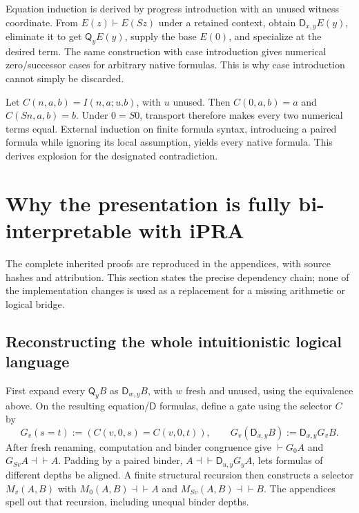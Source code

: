 \documentclass[11pt,letterpaper]{article}
\theoremstyle{definition}\newtheorem{definition}[theorem]{Definition}
\theoremstyle{remark}\newtheorem{remark}[theorem]{Remark}
\newcommand{\D}{\mathsf D}
\newcommand{\Q}{\mathsf Q}
\begin{document}
Equation induction is derived by progress introduction with an unused
witness coordinate. From $E(z)\vdash E(Sz)$ under a retained context,
obtain $\D_{x,y}E(y)$, eliminate it to get $\Q_yE(y)$, supply the base
$E(0)$, and specialize at the desired term. The same construction with
case introduction gives numerical zero/successor cases for arbitrary
native formulas. This is why case introduction cannot simply be discarded.

Let $C(n,a,b)=I(n,a;u.b)$, with $u$ unused. Then $C(0,a,b)=a$ and
$C(Sn,a,b)=b$. Under $0=S0$, transport therefore makes every two numerical
terms equal. External induction on finite formula syntax, introducing a
paired formula while ignoring its local assumption, yields every native
formula. This derives explosion for the designated contradiction.

\section{Why the presentation is fully bi-interpretable with iPRA}
\label{sec:equivalence}

The complete inherited proofs are reproduced in the appendices, with source
hashes and attribution. This section states the precise dependency chain;
none of the implementation changes is used as a replacement for a missing
arithmetic or logical bridge.

\subsection{Reconstructing the whole intuitionistic logical language}

First expand every $\Q_yB$ as $\D_{w,y}B$, with $w$ fresh and unused,
using the equivalence above. On the resulting equation/$\D$ formulas,
define a gate using the selector $C$ by
\[
 G_v(s=t):=(C(v,0,s)=C(v,0,t)),\qquad
 G_v(\D_{x,y}B):=\D_{x,y}G_vB.
\]
After fresh renaming, computation and binder congruence give
$\vdash G_0A$ and $G_{Sv}A\dashv\vdash A$. Padding by a paired binder,
$A\dashv\vdash\D_{u,y}G_yA$, lets formulas of different depths be aligned.
A finite structural recursion then constructs a selector $M_v(A,B)$ with
$M_0(A,B)\dashv\vdash A$ and $M_{Sv}(A,B)\dashv\vdash B$.
The appendices spell out that recursion, including unequal binder depths.
\end{document}
